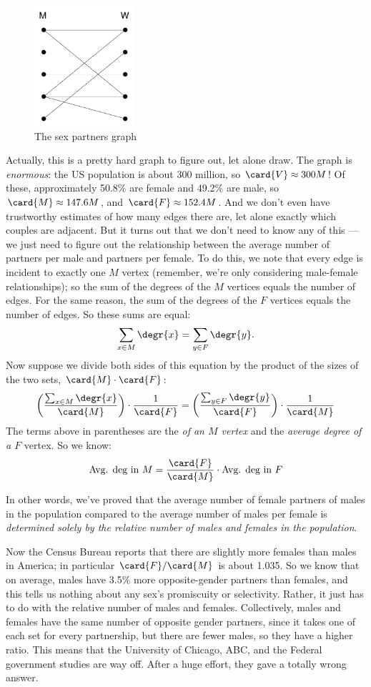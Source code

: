 \begin{figure}[htbp]
\centering \includegraphics[height=1.75in]{figures/sex-edges.pdf}
\caption{The sex partners graph}
\label{fig:partners}
\end{figure}

Actually, this is a pretty hard graph to figure out, let alone draw.  The graph
is \emph{enormous}: the US population is about 300 million, so $\card{V} \approx 300M$!
Of these, approximately 50.8\% are female and 49.2\% are male, so $\card{M} \approx
147.6M$, and $\card{F} \approx 152.4M$.  And we don't even have trustworthy estimates
of how many edges there are, let alone exactly which couples are adjacent.  But it
turns out that we don't need to know any of this ---we just need to figure out the
relationship between the average number of partners per male and partners per female.
To do this, we note that every edge is incident to exactly one $M$ vertex (remember,
we're only considering male-female relationships); so the sum of the degrees of the $M$
vertices equals the number of edges.  For the same reason, the sum of the degrees of
the $F$ vertices equals the number of edges.  So these sums are equal:
%
\[
\sum_{x \in M} \degr{x} = \sum_{y \in F} \degr{y}.
\]
%
Now suppose we divide both sides of this equation by the product of the sizes of the
two sets, $\card{M} \cdot \card{F}$:
%
\[
\left(\frac{\sum_{x \in M} \degr{x}}{\card{M}}\right) \cdot \frac{1}{\card{F}} =
\left(\frac{\sum_{y \in F} \degr{y}}{\card{F}}\right) \cdot \frac{1}{\card{M}}
\]
%
The terms above in parentheses are the \emph{ of an $M$ vertex} and
  the \emph{average degree of a $F$} vertex.  So we know:
\[
\text{Avg. deg in $M$} = \frac{\card{F}}{\card{M}} \cdot \text{Avg. deg in $F$}
\]

In other words, we've proved that the average number of female partners of males in the
population compared to the average number of males per female is \emph{determined
solely by the relative number of males and females in the population}.

Now the Census Bureau reports that there are slightly more females than males in
America; in particular $\card{F} / \card{M}$ is about 1.035.  So we know that on
average, males have 3.5\% more opposite-gender partners than females, and this tells us
nothing about any sex's promiscuity or selectivity.  Rather, it just has to do with the
relative number of males and females.  Collectively, males and females have the same
number of opposite gender partners, since it takes one of each set for every
partnership, but there are fewer males, so they have a higher ratio.  This means that
the University of Chicago, ABC, and the Federal government studies are way off.  After
a huge effort, they gave a totally wrong answer.

